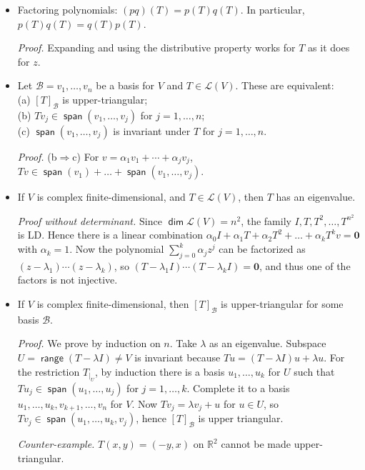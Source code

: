 \documentclass[11pt]{article}
\newcommand{\1}{\mathbf{1}}
\newcommand{\0}{\mathbf{0}}
\newcommand{\B}{\mathcal{B}}
\newcommand{\cL}{\mathcal{L}}
\newcommand{\R}{\mathbb{R}}
\DeclareMathOperator{\myspan}{\mathsf{span}}
\DeclareMathOperator{\myrange}{\mathsf{range}}
\DeclareMathOperator{\mydim}{\mathsf{dim}}
\begin{document}
\begin{itemize}
\item

Factoring polynomials: $(pq)(T) = p(T)q(T)$. In particular, $ p(T)q(T) = q(T)p(T) $.

\emph{Proof.}
Expanding and using the distributive property works for $T$ as it does for $z$.

\item


Let $\B = v_1,\dots,v_n$ be a basis for $V$ and $T \in \cL(V)$.
These are equivalent:
\\
(a) $ [T]_\B $ is upper-triangular;
\\
(b) $ Tv_j \in \myspan(v_1,\dots,v_j) $ for $j=1,\dots,n$;
\\
(c) $ \myspan(v_1,\dots,v_j) $ is invariant under $T$ for $j=1,\dots,n$.

\emph{Proof.}
(b$ \Rightarrow $c)
For $v = \alpha_1 v_1 + \cdots + \alpha_j v_j$, $Tv \in \myspan(v_1) + \dots + \myspan(v_1,\dots,v_j)$.

\item


If $V$ is complex finite-dimensional, and $T \in \cL(V)$, then $T$ has an eigenvalue.

\emph{Proof without determinant.}
Since $\mydim \cL(V)=n^2$, the family $I,T,T^2,\dots,T^{n^2}$ is LD.
Hence there is a linear combination
$\alpha_0 I + \alpha_1 T + \alpha_2 T^2 + \dots + \alpha_k T^kv = \0$ with $\alpha_k = 1$.
Now the polynomial $\sum_{j=0}^k \alpha_j z^j$ can be factorized as $(z-\lambda_1)\cdots(z-\lambda_k)$, so $(T-\lambda_1 I)\cdots(T-\lambda_k I)=\0$, and thus one of the factors is not injective.

\item

If $V$ is complex finite-dimensional, then $[T]_\B$ is upper-triangular for some basis $\B$.


\emph{Proof.}
We prove by induction on $n$.
Take $\lambda$ as an eigenvalue.
Subspace $U = \myrange (T - \lambda I) \ne V$ is invariant because $ T u = (T-\lambda I)u + \lambda u $.
For the restriction $T_{|_U}$, by induction there is a basis $u_1,\dots,u_k$ for $U$ such that $Tu_j \in \myspan(u_1,\dots,u_j)$ for $j=1,\dots,k$.
Complete it to a basis $u_1,\dots,u_k,v_{k+1},\dots,v_n$ for $V$.
Now $Tv_j = \lambda v_j + u$ for $u \in U$, so $Tv_j \in \myspan(u_1,\dots,u_k,v_j)$, hence $[T]_\B$ is upper triangular.

\emph{Counter-example.}
$T(x,y)=(-y,x)$ on $\R^2$ cannot be made upper-triangular.

\end{itemize}
\end{document}
